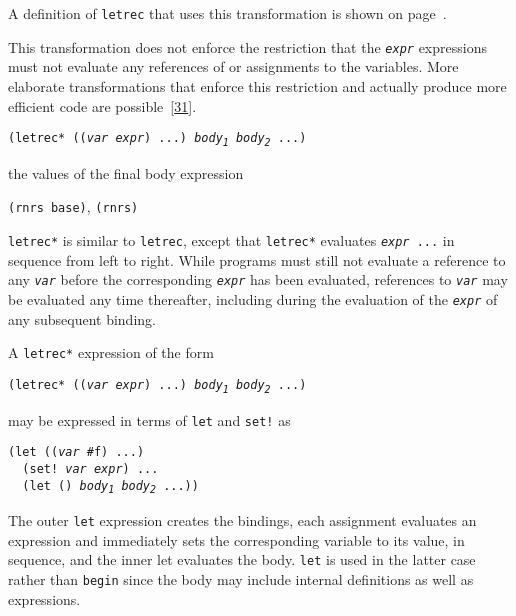 A definition of \texttt{letrec} that uses this transformation is shown
on page \pageref{syntax_defn_letrec}.


This transformation does not enforce the restriction that
the \texttt{\textit{expr}} expressions must not evaluate any references of or
assignments to the variables.
More elaborate transformations that enforce this restriction and
actually produce more efficient code are
possible [\hyperref[bibliography_g249]{31}].

\begin{description}

\label{binding_s22}\label{binding_desc_letrec*}
\item[syntax] \texttt{(letrec* ((\textit{var} \textit{expr}) ...) \textit{body\textsubscript{1}} \textit{body\textsubscript{2}} ...)}



\item[returns] the values of the final body expression


\item[libraries] \texttt{(rnrs base)}, \texttt{(rnrs)}
\end{description}

\texttt{letrec*} is similar to \texttt{letrec}, except that
\texttt{letrec*} evaluates \texttt{\textit{expr} ...} in sequence from left to right.
While programs must still not evaluate a reference to any \texttt{\textit{var}}
before the corresponding \texttt{\textit{expr}} has been evaluated, references to
\texttt{\textit{var}} may be evaluated any time thereafter, including during
the evaluation of the \texttt{\textit{expr}} of any subsequent binding.

A \texttt{letrec*} expression of the form


\texttt{(letrec* ((\textit{var} \textit{expr}) ...) \textit{body\textsubscript{1}} \textit{body\textsubscript{2}} ...)}

may be expressed in terms of \texttt{let} and \texttt{set!} as


\begin{alltt}
(let ((\textit{var} \#{}f) ...)
  (set! \textit{var} \textit{expr}) ...
  (let () \textit{body\textsubscript{1}} \textit{body\textsubscript{2}} ...))
\end{alltt}


The outer \texttt{let} expression creates the bindings, each assignment
evaluates an expression and immediately sets the corresponding variable
to its value, in sequence, and the inner let evaluates the body.
\texttt{let} is used in the latter case rather than \texttt{begin}
since the body may include internal definitions as well as expressions.


